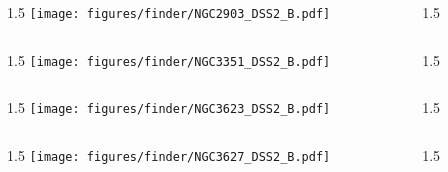 \documentclass[final]{beamer}
\newlength{\colwidth}
\begin{document}

\begin{frame}[t]{}
  \begin{columns}[T]
    \begin{column}{1.5\colwidth}
      \centering
      \texttt{[image: figures/finder/NGC2903\_DSS2\_B.pdf]}
    \end{column}
    \begin{column}{1.5\colwidth}
      \Large
      
    \end{column}
  \end{columns}
  \vspace{\fill}
  \begin{columns}[T]
    \begin{column}{1.5\colwidth}
      \centering
      \texttt{[image: figures/finder/NGC3351\_DSS2\_B.pdf]}
    \end{column}
    \begin{column}{1.5\colwidth}
      \Large
      
    \end{column}
  \end{columns}
\end{frame}


\begin{frame}[t]{}
  \begin{columns}[T]
    \begin{column}{1.5\colwidth}
      \centering
      \texttt{[image: figures/finder/NGC3623\_DSS2\_B.pdf]}
    \end{column}
    \begin{column}{1.5\colwidth}
      \Large
      
    \end{column}
  \end{columns}
  \vspace{\fill}
  \begin{columns}[T]
    \begin{column}{1.5\colwidth}
      \centering
      \texttt{[image: figures/finder/NGC3627\_DSS2\_B.pdf]}
    \end{column}
    \begin{column}{1.5\colwidth}
      \Large
      
    \end{column}
  \end{columns}
\end{frame}
\end{document}

